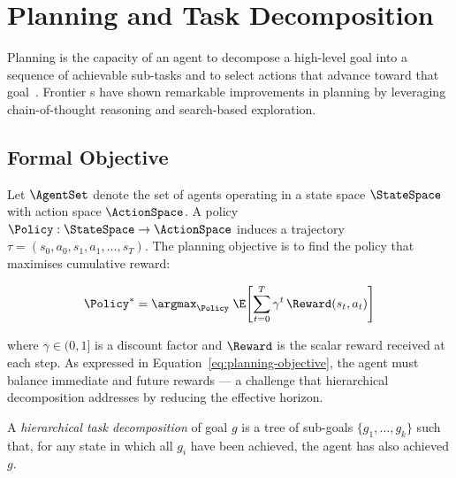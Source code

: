 \chapter{Planning and Task Decomposition}
\label{chap:planning}

Planning is the capacity of an agent to decompose a high-level goal into a
sequence of achievable sub-tasks and to select actions that advance toward
that goal~\cite{correa2025planningperformance}.
Frontier \LLM{}s have shown remarkable improvements in planning by leveraging
chain-of-thought reasoning and search-based exploration.


\section{Formal Objective}
\label{sec:planning-objective}

Let $\AgentSet$ denote the set of agents operating in a state space
$\StateSpace$ with action space $\ActionSpace$.
A policy $\Policy : \StateSpace \to \ActionSpace$ induces a trajectory
$\tau = (s_0, a_0, s_1, a_1, \ldots, s_T)$.
The planning objective is to find the policy that maximises cumulative reward:

\begin{equation}
  \label{eq:planning-objective}
  \Policy^{*} = \argmax_{\Policy} \;\E\!\left[\sum_{t=0}^{T} \gamma^{t}\,
  \Reward(s_t, a_t)\right]
\end{equation}

where $\gamma \in (0,1]$ is a discount factor and $\Reward$ is the scalar
reward received at each step.
As expressed in Equation~\eqref{eq:planning-objective}, the agent must
balance immediate and future rewards — a challenge that hierarchical
decomposition addresses by reducing the effective horizon.

\begin{definition}
  \label{def:htd}
  A \emph{hierarchical task decomposition} of goal $g$ is a tree of
  sub-goals $\{g_1, \ldots, g_k\}$ such that, for any state in which all
  $g_i$ have been achieved, the agent has also achieved $g$.
\end{definition}

